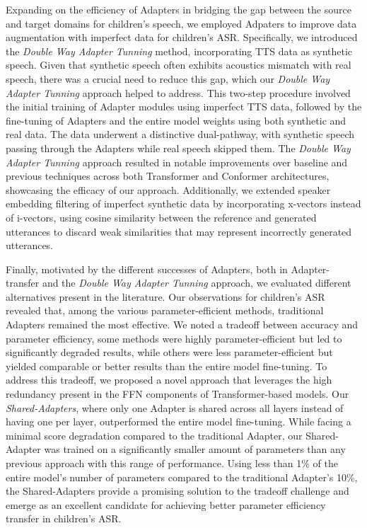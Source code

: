 Expanding on the efficiency of Adapters in bridging the gap between the source and target domains for children's speech, we employed Adpaters to improve data augmentation with imperfect data for children's \ac{ASR}. Specifically, we introduced the \textit{Double Way Adapter Tunning} method, incorporating \ac{TTS} data as synthetic speech. Given that synthetic speech often exhibits acoustics mismatch with real speech, there was a crucial need to reduce this gap, which our \textit{Double Way Adapter Tunning} approach helped to address. This two-step procedure involved the initial training of Adapter modules using imperfect \ac{TTS} data, followed by the fine-tuning of Adapters and the entire model weights using both synthetic and real data. The data underwent a distinctive dual-pathway, with synthetic speech passing through the Adapters while real speech skipped them. The \textit{Double Way Adapter Tunning} approach resulted in notable improvements over baseline and previous techniques across both Transformer and Conformer architectures, showcasing the efficacy of our approach. Additionally, we extended speaker embedding filtering of imperfect synthetic data by incorporating x-vectors instead of i-vectors, using cosine similarity between the reference and generated utterances to discard weak similarities that may represent incorrectly generated utterances.

Finally, motivated by the different successes of Adapters, both in Adapter-transfer and the \textit{Double Way Adapter Tunning} approach, we evaluated different alternatives present in the literature. Our observations for children's \ac{ASR} revealed that, among the various parameter-efficient methods, traditional Adapters remained the most effective. We noted a tradeoff between accuracy and parameter efficiency, some methods were highly parameter-efficient but led to significantly degraded results, while others were less parameter-efficient but yielded comparable or better results than the entire model fine-tuning. To address this tradeoff, we proposed a novel approach that leverages the high redundancy present in the \ac{FFN} components of Transformer-based models. Our \textit{Shared-Adapters}, where only one Adapter is shared across all layers instead of having one per layer, outperformed the entire model fine-tuning. While facing a minimal score degradation compared to the traditional Adapter, our Shared-Adapter was trained on a significantly smaller amount of parameters than any previous approach with this range of performance. Using less than 1\% of the entire model's number of parameters compared to the traditional Adapter's 10\%, the Shared-Adapters provide a promising solution to the tradeoff challenge and emerge as an excellent candidate for achieving better parameter efficiency transfer in children's \ac{ASR}.

